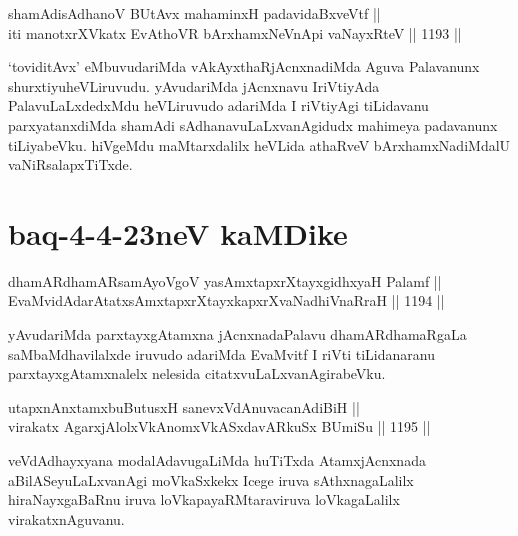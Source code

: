 \begin{shl}
shamAdisAdhanoV BUtAvx mahaminxH padavidaBxveVtf ||  \\
iti manotxrXVkatx EvAthoVR bArxhamxNeVnApi vaNayxRteV \hfill || 1193 ||  
\end{shl}


\begin{artha}
`toviditAvx' eMbuvudariMda vAkAyxthaRjAcnxnadiMda Aguva Palavanunx shurxtiyuheVLiruvudu. yAvudariMda jAcnxnavu IriVtiyAda PalavuLaLxdedxMdu heVLiruvudo adariMda I riVtiyAgi tiLidavanu parxyatanxdiMda shamAdi sAdhanavuLaLxvanAgidudx mahimeya padavanunx tiLiyabeVku. hiVgeMdu maMtarxdalilx heVLida athaRveV bArxhamxNadiMdalU vaNiRsalapxTiTxde.
\end{artha}

\section*{baq-4-4-23neV kaMDike}


\begin{shl}
dhamARdhamARsamAyoVgoV yasAmxtapxrXtayxgidhxyaH Palamf ||  \\
EvaMvidAdarAtatxsAmxtapxrXtayxkapxrXvaNadhiVnaRraH \hfill || 1194 ||  
\end{shl}

\begin{artha}
yAvudariMda parxtayxgAtamxna jAcnxnadaPalavu dhamARdhamaRgaLa saMbaMdhavilalxde iruvudo adariMda EvaMvitf I riVti tiLidanaranu parxtayxgAtamxnalelx nelesida citatxvuLaLxvanAgirabeVku.
\end{artha}

\begin{shl}
utapxnAnxtamxbuButusxH sanevxVdAnuvacanAdiBiH || \\
virakatx AgarxjAlolxVkAnomxVkASxdavARkuSx BUmiSu \hfill || 1195 || 
\end{shl}

\begin{artha}
veVdAdhayxyana modalAdavugaLiMda huTiTxda AtamxjAcnxnada aBilASeyuLaLxvanAgi moVkaSxkekx Icege iruva sAthxnagaLalilx hiraNayxgaBaRnu iruva loVkapayaRMtaraviruva loVkagaLalilx virakatxnAguvanu.
\end{artha}


